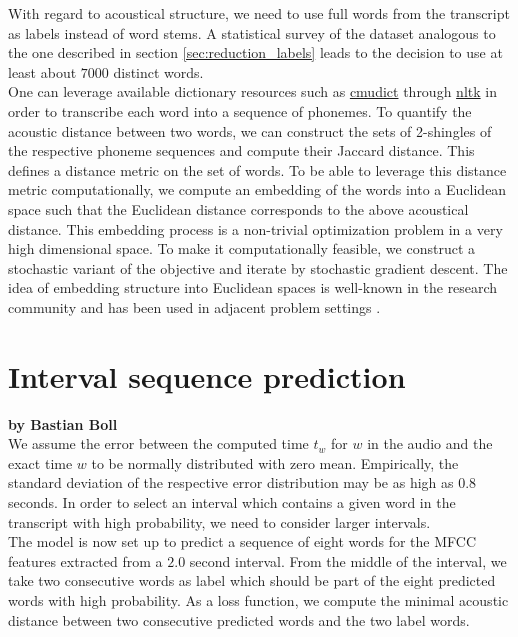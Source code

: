 With regard to acoustical structure, we need to use full words from the transcript as labels instead of word stems. A statistical survey of the dataset analogous to the one described in section \ref{sec:reduction_labels} leads to the decision to use at least about $7000$ distinct words.\\
One can leverage available dictionary resources such as \href{https://github.com/cmusphinx/cmudict}{cmudict} through \href{https://www.nltk.org/}{nltk} in order to transcribe each word into a sequence of phonemes. To quantify the acoustic distance between two words, we can construct the sets of 2-shingles of the respective phoneme sequences and compute their Jaccard distance. This defines a distance metric on the set of words. To be able to leverage this distance metric computationally, we compute an embedding of the words into a Euclidean space such that the Euclidean distance corresponds to the above acoustical distance. This embedding process is a non-trivial optimization problem in a very high dimensional space. To make it computationally feasible, we construct a stochastic variant of the objective and iterate by stochastic gradient descent. The idea of  embedding structure into Euclidean spaces is well-known in the research community and has been used in adjacent problem settings \cite{silfverberg2018sound,goldberg2014word2vec,tang2014learning}.


\section{Interval sequence prediction}
\label{seq:interval_seq}

\textbf{by Bastian Boll} \\
We assume the error between the computed time $t_w$ for $w$ in the audio and the exact time $w$ to be normally distributed with zero mean. Empirically, the standard deviation of the respective error distribution may be as high as $0.8$ seconds. In order to select an interval which contains a given word in the transcript with high probability, we need to consider larger intervals.\\
The model is now set up to predict a sequence of eight words for the MFCC features extracted from a $2.0$ second interval. From the middle of the interval, we take two consecutive words as label which should be part of the eight predicted words with high probability. As a loss function, we compute the minimal acoustic distance between two consecutive predicted words and the two label words.


